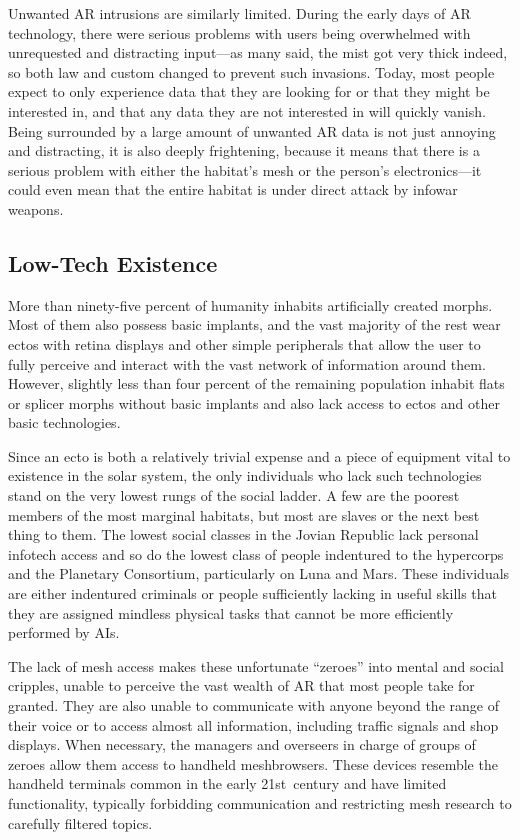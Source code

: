 Unwanted AR intrusions are similarly limited. 
During the early days of AR technology, there were 
serious problems with users being overwhelmed with 
unrequested and distracting input—as many said, the 
mist got very thick indeed, so both law and custom 
changed to prevent such invasions. Today, most people 
expect to only experience data that they are looking for 
or that they might be interested in, and that any data 
they are not interested in will quickly vanish. Being 
surrounded by a large amount of unwanted AR data 
is not just annoying and distracting, it is also deeply 
frightening, because it means that there is a serious 
problem with either the habitat's mesh or the person's 
electronics—it could even mean that the entire habitat 
is under direct attack by infowar weapons.

\subsection{Low-Tech Existence}

More than ninety-five percent of humanity inhabits 
artificially created morphs. Most of them also possess 
basic implants, and the vast majority of the rest wear 
ectos with retina displays and other simple peripherals
that allow the user to fully perceive and interact
with the vast network of information around them. 
However, slightly less than four percent of the remaining
population inhabit flats or splicer morphs without
basic implants and also lack access to ectos and other 
basic technologies.

Since an ecto is both a relatively trivial expense and 
a piece of equipment vital to existence in the solar 
system, the only individuals who lack such technologies
stand on the very lowest rungs of the social ladder.
A few are the poorest members of the most marginal 
habitats, but most are slaves or the next best thing to 
them. The lowest social classes in the Jovian Republic 
lack personal infotech access and so do the lowest 
class of people indentured to the hypercorps and the 
Planetary Consortium, particularly on Luna and Mars. 
These individuals are either indentured criminals or 
people sufficiently lacking in useful skills that they are 
assigned mindless physical tasks that cannot be more 
efficiently performed by AIs.

The lack of mesh access makes these unfortunate 
``zeroes'' into mental and social cripples, unable to perceive
the vast wealth of AR that most people take for
granted. They are also unable to communicate with 
anyone beyond the range of their voice or to access 
almost all information, including traffic signals and 
shop displays. When necessary, the managers and 
overseers in charge of groups of zeroes allow them 
access to handheld meshbrowsers. These devices resemble
the handheld terminals common in the early
21st century and have limited functionality, typically 
forbidding communication and restricting mesh research
to carefully filtered topics.

